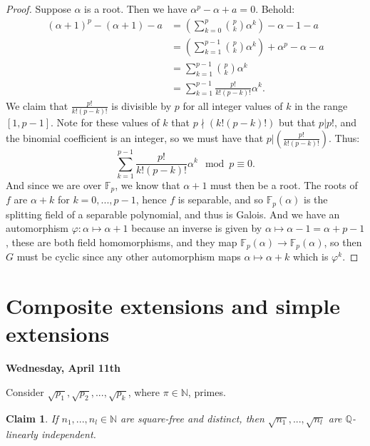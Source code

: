 \documentclass[9pt,reqno,twoside]{amsbook}
\theoremstyle{plain}
\newtheorem*{Claim}{Claim}
\numberwithin{section}{chapter}
\numberwithin{equation}{chapter}
\theoremstyle{definition}
\theoremstyle{remark}
\theoremstyle{plain}
\newcommand{\n}{\mathbb{N}}
\newcommand{\Q}{\mathbb{Q}}
\newcommand{\F}{\mathbb{F}}
\newcommand{\bee}{\begin{equation}\begin{aligned}}
\newcommand{\eee}{\end{aligned}\end{equation}}
\newcommand{\fracc}{\frac}
\newcommand{\lpar}{\left(}
\newcommand{\rpar}{\right)}
\newcommand{\qwe}{\sqrt}
\renewcommand{\phi}{\varphi}
\begin{document}
\begin{enumerate}[label=\arabic*.]
\begin{proof}
Suppose $\alpha$ is a root. Then we have $\alpha^p - \alpha + a = 0$. Behold: 
\bee
(\alpha + 1)^p - (\alpha + 1) - a &= \lpar\sum_{k = 0}^p \binom{p}{k}\alpha^k\rpar - \alpha - 1 - a\\
&= \lpar \sum_{k = 1}^{p - 1} \binom{p}{k}\alpha^k \rpar + \alpha^p - \alpha - a\\
&= \sum_{k = 1}^{p - 1} \binom{p}{k}\alpha^k \\
&= \sum_{k = 1}^{p - 1} \fracc{p!}{k!(p - k)!}\alpha^k.
\eee
We claim that $\fracc{p!}{k!(p - k)!}$ is divisible by $p$ for all integer values of $k$ in the range $[1,p - 1]$. Note for these values of $k$ that $p\nmid (k!(p - k)!)$ but that $p|p!$, and the binomial coefficient is an integer, so we must have that $p|\lpar \fracc{p!}{k!(p - k)!} \rpar $. Thus: 
$$
\sum_{k = 1}^{p - 1} \fracc{p!}{k!(p - k)!}\alpha^k \mod p \equiv 0.
$$
And since we are over $\F_p$, we know that $\alpha + 1$ must then be a root. The roots of $f$ are $\alpha + k$ for $k = 0,...,p - 1$, hence $f$ is separable, and so $\F_p(\alpha)$ is the splitting field of a separable polynomial, and thus is Galois. And we have an automorphism $\phi:\alpha \mapsto \alpha + 1$ because an inverse is given by $\alpha \mapsto \alpha - 1 = \alpha + p - 1$, these are both field homomorphisms, and they map $\F_p(\alpha) \to \F_p(\alpha)$, so then $G$ must be cyclic since any other automorphism maps $\alpha \mapsto \alpha + k$ which is $\phi^k$. 
\end{proof}
\end{enumerate}










\section{Composite extensions and simple extensions}

\textbf{Wednesday, April 11th}


Consider $\qwe{p_1},\qwe{p_2},...,\qwe{p_k}$, where $\pi \in \n$, primes. 

\begin{Claim}
If $n_1,...,n_l \in \n$ are square-free and distinct, then $\qwe{n_1},...,\qwe{n_l}$ are $\Q$-linearly independent. 
\end{Claim}
\end{document}
